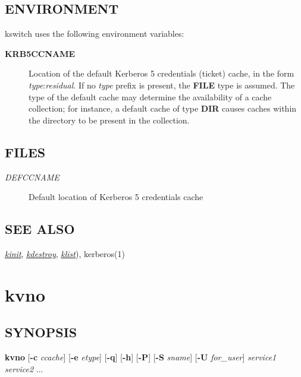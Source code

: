 \documentclass[letterpaper,10pt,english]{sphinxmanual}
\begin{document}
\subsection{ENVIRONMENT}
\label{user/user_commands/kswitch:environment}
kswitch uses the following environment variables:
\begin{description}
\item[{\textbf{KRB5CCNAME}}] \leavevmode
Location of the default Kerberos 5 credentials (ticket) cache, in
the form \emph{type}:\emph{residual}.  If no \emph{type} prefix is present, the
\textbf{FILE} type is assumed.  The type of the default cache may
determine the availability of a cache collection; for instance, a
default cache of type \textbf{DIR} causes caches within the directory
to be present in the collection.

\end{description}


\subsection{FILES}
\label{user/user_commands/kswitch:files}\begin{description}
\item[{\emph{DEFCCNAME}}] \leavevmode
Default location of Kerberos 5 credentials cache

\end{description}


\subsection{SEE ALSO}
\label{user/user_commands/kswitch:see-also}
{\hyperref[user/user_commands/kinit:kinit-1]{\emph{kinit}}}, {\hyperref[user/user_commands/kdestroy:kdestroy-1]{\emph{kdestroy}}}, {\hyperref[user/user_commands/klist:klist-1]{\emph{klist}}}), kerberos(1)


\section{kvno}
\label{user/user_commands/kvno:kvno-1}\label{user/user_commands/kvno::doc}\label{user/user_commands/kvno:kvno}

\subsection{SYNOPSIS}
\label{user/user_commands/kvno:synopsis}
\textbf{kvno}
{[}\textbf{-c} \emph{ccache}{]}
{[}\textbf{-e} \emph{etype}{]}
{[}\textbf{-q}{]}
{[}\textbf{-h}{]}
{[}\textbf{-P}{]}
{[}\textbf{-S} \emph{sname}{]}
{[}\textbf{-U} \emph{for\_user}{]}
\emph{service1 service2} ...
\end{document}
